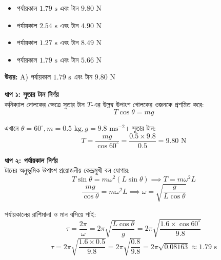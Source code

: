 \documentclass[12pt, a4paper]{article}
\begin{document}
\begin{itemize}[label={}, leftmargin=1cm, itemsep=0.5em]
    \item[\textbf{A)}] পর্যায়কাল $1.79\text{ s}$ এবং টান $9.80\text{ N}$
    \item[\textbf{B)}] পর্যায়কাল $2.54\text{ s}$ এবং টান $4.90\text{ N}$
    \item[\textbf{C)}] পর্যায়কাল $1.27\text{ s}$ এবং টান $8.49\text{ N}$
    \item[\textbf{D)}] পর্যায়কাল $1.79\text{ s}$ এবং টান $5.66\text{ N}$
\end{itemize}

\vspace{0.5em}
\begin{tcolorbox}[answerbox]
    \textbf{\color{success} উত্তর:} A) পর্যায়কাল $1.79\text{ s}$ এবং টান $9.80\text{ N}$
\end{tcolorbox}
\vspace{1em}

\begin{tcolorbox}[solutionbox={সমাধান (Solution)}]
    \noindent
    \textbf{ধাপ ১: সুতার টান নির্ণয়} \\
    কনিক্যাল দোলকের ক্ষেত্রে সুতার টান $T$-এর উল্লম্ব উপাংশ গোলকের ওজনকে প্রশমিত করে:
    \[ T \cos\theta = mg \]
    
    এখানে $\theta = 60^\circ, m = 0.5\text{ kg}, g = 9.8\text{ ms}^{-2}$। সুতার টান:
    \[ T = \frac{mg}{\cos 60^\circ} = \frac{0.5 \times 9.8}{0.5} = \mathbf{9.80}\text{ N} \]
    
    \vspace{0.5em}
    \noindent\textbf{ধাপ ২: পর্যায়কাল নির্ণয়} \\
    টানের অনুভূমিক উপাংশ প্রয়োজনীয় কেন্দ্রমুখী বল যোগায়:
    \[ T \sin\theta = m \omega^2 (L \sin\theta) \implies T = m \omega^2 L \]
    \[ \frac{mg}{\cos\theta} = m \omega^2 L \implies \omega = \sqrt{\frac{g}{L \cos\theta}} \]
    
    পর্যায়কালের রাশিমালা ও মান বসিয়ে পাই:
    \[ \tau = \frac{2\pi}{\omega} = 2\pi \sqrt{\frac{L \cos\theta}{g}} = 2\pi \sqrt{\frac{1.6 \times \cos 60^\circ}{9.8}} \]
    \[ \tau = 2\pi \sqrt{\frac{1.6 \times 0.5}{9.8}} = 2\pi \sqrt{\frac{0.8}{9.8}} = 2\pi \sqrt{0.08163} \approx \mathbf{1.79}\text{ s} \]
\end{tcolorbox}
\end{document}
